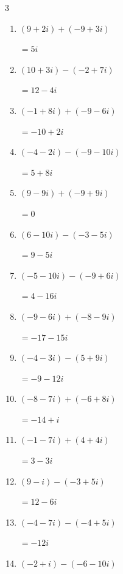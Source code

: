 \begin{multicols}{3}
\begin{enumerate}
        $\displaystyle =-10-7i$

  \item $\displaystyle (9+2i) + (-9+3i)$

        $\displaystyle =5i$

  \item $\displaystyle (10+3i) - (-2+7i)$

        $\displaystyle =12-4i$

  \item $\displaystyle (-1+8i) + (-9-6i)$

        $\displaystyle =-10+2i$

  \item $\displaystyle (-4-2i) - (-9-10i)$

        $\displaystyle =5+8i$

  \item $\displaystyle (9-9i) + (-9+9i)$

        $\displaystyle =0$

  \item $\displaystyle (6-10i) - (-3-5i)$

        $\displaystyle =9-5i$

  \item $\displaystyle (-5-10i) - (-9+6i)$

        $\displaystyle =4-16i$

  \item $\displaystyle (-9-6i) + (-8-9i)$

        $\displaystyle =-17-15i$

  \item $\displaystyle (-4-3i) - (5+9i)$

        $\displaystyle =-9-12i$

  \item $\displaystyle (-8-7i) + (-6+8i)$

        $\displaystyle =-14+i$

  \item $\displaystyle (-1-7i) + (4+4i)$

        $\displaystyle =3-3i$

  \item $\displaystyle (9-i) - (-3+5i)$

        $\displaystyle =12-6i$

  \item $\displaystyle (-4-7i) - (-4+5i)$

        $\displaystyle =-12i$

  \item $\displaystyle (-2+i) - (-6-10i)$


\end{enumerate}
\end{multicols}
